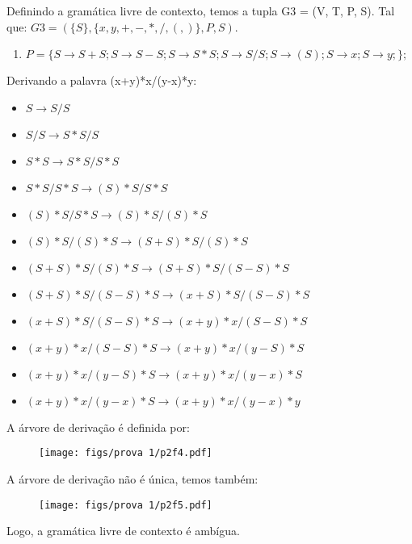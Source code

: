 \documentclass{article}
\begin{document}
    \begin{solution}
    
        Definindo a gramática livre de contexto, temos a tupla G3 = (V, T, P, S). Tal que: $G3 = (\{S\}, \{x,y,+,-,*,/,(,)\}, P, S)$.
        
        \begin{enumerate}[label=]
            \item $P = \{S \rightarrow S + S;
            S \rightarrow S - S;
            S \rightarrow  S * S; 
            S \rightarrow  S / S;
            S \rightarrow  (S);
            S \rightarrow  x; 
            S \rightarrow  y; 
            \};$
        \end{enumerate}
        
  Derivando a palavra (x+y)*x/(y-x)*y:
        \begin{itemize}
            \item $S \rightarrow S / S$
            \item $S / S \rightarrow S * S / S $
            \item $S * S \rightarrow S * S / S * S$
            \item $S * S / S * S \rightarrow (S) * S / S * S$
            \item $(S) * S / S * S \rightarrow (S) * S / (S) * S$
            \item $(S) * S / (S) * S \rightarrow (S + S) * S / (S)* S $
            \item $ (S + S) * S / (S)* S \rightarrow (S + S) * S / (S - S) * S $
            \item $(S + S) * S / (S - S) * S  \rightarrow (x + S) * S / (S - S) * S $
            \item $(x + S) * S / (S - S) * S  \rightarrow (x + y) * x / (S - S) * S $
            \item $(x + y) * x / (S - S) * S \rightarrow (x + y) * x / (y - S) * S $
            \item $(x + y) * x / (y - S) * S  \rightarrow (x + y) * x / (y - x) * S $
            \item $(x + y) * x / (y - x) * S  \rightarrow (x + y) * x / (y - x) * y $
             
        \end{itemize}
        
        A árvore de derivação é definida por: 
        \begin{figure}[H]
             \centering
             \texttt{[image: figs/prova 1/p2f4.pdf]}
        \end{figure}
        
        A árvore de derivação não é única, temos também:
        \begin{figure}[H]
             \centering
             \texttt{[image: figs/prova 1/p2f5.pdf]}
        \end{figure}
        
        Logo, a gramática livre de contexto é ambígua.
        
    \end{solution}
    
\end{document}
